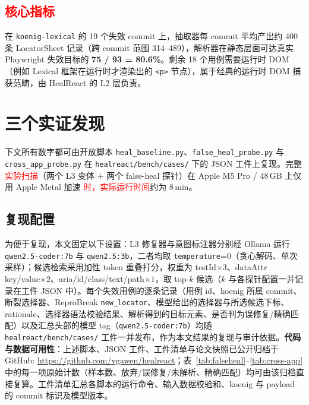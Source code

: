 \documentclass[UTF8, a4paper, 10.5pt, twocolumn, fontset=none]{ctexart}
\providecommand{\DIFaddbegin}{} %
\providecommand{\DIFaddend}{} %
\providecommand{\DIFaddtex}[1]{\textcolor{red}{#1}} %
\providecommand{\DIFadd}[1]{\texorpdfstring{\DIFaddtex{#1}}{#1}} %
\providecommand{\DIFaddincludegraphics}[2][]{{\color{blue}\fbox{\DIFOincludegraphics[#1]{#2}}}} %
\DeclareRobustCommand{\DIFaddbegin}{\DIFOaddbegin \let\includegraphics\DIFaddincludegraphics} %
\DeclareRobustCommand{\DIFaddend}{\DIFOaddend \let\includegraphics\DIFOincludegraphics} %
\begin{document}
\subsection{ \DIFaddbegin \DIFadd{核心指标}\DIFaddend }
在 \texttt{koenig-lexical} 的 19 个失效 commit 上，抽取器每 commit 平均产出约 400 条 LocatorSheet 记录（跨 commit 范围 314--489），解析器在静态层面可达真实 Playwright 失效目标的 \textbf{75 / 93 = 80.6\%}。剩余 18 个用例需要运行时 DOM（例如 Lexical 框架在运行时才渲染出的 \texttt{<p>} 节点），属于经典的运行时 DOM 捕获范畴，由 HealReact 的 L2 层负责。

\section{三个实证发现}
\label{sec:findings}

下文所有数字都可由开放脚本 \texttt{heal\_baseline.py}、\texttt{false\_heal\_probe.py} 与 \texttt{cross\_app\_probe.py} 在 \texttt{healreact/bench/cases/} 下的 JSON 工件上复现。完整 \DIFaddbegin \DIFadd{实验扫描}\DIFaddend （两个 L3 变体 + 两个 false-heal 探针）在 Apple M5 Pro / 48\,GB 上仅用 Apple Metal 加速 \DIFaddbegin \DIFadd{时，实际运行时间}\DIFaddend 约为 8\,min。

\subsection{复现配置}
为便于复现，本文固定以下设置：L3 修复器与意图标注器分别经 Ollama 运行 \texttt{qwen2.5-coder:7b} 与 \texttt{qwen2.5:3b}，二者均取 \texttt{temperature}=0（贪心解码、单次采样）；候选检索采用加性 token 重叠打分，权重为 testId$\times 3$、dataAttr key/value$\times 2$、aria/id/class/text/path$\times 1$，取 top-$k$ 候选（$k$ 与各探针配置一并记录在工件 JSON 中）。每个失效用例的逐条记录（用例 id、koenig 所属 commit、断裂选择器、ReproBreak \texttt{new\_locator}、模型给出的选择器与所选候选下标、rationale、选择器语法校验结果、解析得到的目标元素、是否判为误修复/精确匹配）以及汇总头部的模型 tag（\texttt{qwen2.5-coder:7b}）均随 \texttt{healreact/bench/cases/} 工件一并发布，作为本文结果的复现与审计依据。\textbf{代码与数据可用性}：上述脚本、JSON 工件、工件清单与论文快照已公开归档于 GitHub: \url{https://github.com/vgawen/healreact}；表~\ref{tab:falseheal}--\ref{tab:cross-app} 中的每一项原始计数（样本数、放弃/误修复/未解析、精确匹配）均可由该归档直接复算。工件清单汇总各脚本的运行命令、输入数据校验和、koenig 与 payload 的 commit 标识及模型版本。
\end{document}
